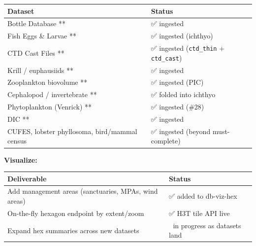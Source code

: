 \documentclass[
  letterpaper,
  DIV=11,
  numbers=noendperiod]{scrreprt}
\begin{document}
\begin{longtable}[]{@{}
  >{\raggedright\arraybackslash}p{}
  >{\raggedright\arraybackslash}p{}@{}}
\toprule\noalign{}
\begin{minipage}[b]{\linewidth}\raggedright
Dataset
\end{minipage} & \begin{minipage}[b]{\linewidth}\raggedright
Status
\end{minipage} \\
\midrule\noalign{}
\endhead
\bottomrule\noalign{}
\endlastfoot
Bottle Database ** & ✅ ingested \\
Fish Eggs \& Larvae ** & ✅ ingested (ichthyo) \\
CTD Cast Files ** & ✅ ingested (\texttt{ctd\_thin} +
\texttt{ctd\_cast}) \\
Krill / euphausiids ** & ✅ ingested \\
Zooplankton biovolume ** & ✅ ingested (PIC) \\
Cephalopod / invertebrate ** & ✅ folded into ichthyo \\
Phytoplankton (Venrick) ** & ✅ ingested (\#28) \\
DIC ** & ✅ ingested \\
CUFES, lobster phyllosoma, bird/mammal census & ✅ ingested (beyond
must-complete) \\
\end{longtable}

\textbf{Visualize:}

\begin{longtable}[]{@{}
  >{\raggedright\arraybackslash}p{}
  >{\raggedright\arraybackslash}p{}@{}}
\toprule\noalign{}
\begin{minipage}[b]{\linewidth}\raggedright
Deliverable
\end{minipage} & \begin{minipage}[b]{\linewidth}\raggedright
Status
\end{minipage} \\
\midrule\noalign{}
\endhead
\bottomrule\noalign{}
\endlastfoot
Add management areas (sanctuaries, MPAs, wind areas) & ✅ added to
db-viz-hex \\
On-the-fly hexagon endpoint by extent/zoom & ✅ H3T tile API live \\
Expand hex summaries across new datasets & 🔄 in progress as datasets
land \\
\end{longtable}
\end{document}
